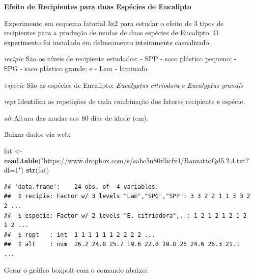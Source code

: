 \documentclass[
]{book}
\newenvironment{Shaded}{\begin{snugshade}}{\end{snugshade}}
\newcommand{\DataTypeTok}[1]{\textcolor[rgb]{0.13,0.29,0.53}{#1}}
\newcommand{\KeywordTok}[1]{\textcolor[rgb]{0.13,0.29,0.53}{\textbf{#1}}}
\newcommand{\NormalTok}[1]{#1}
\newcommand{\OperatorTok}[1]{\textcolor[rgb]{0.81,0.36,0.00}{\textbf{#1}}}
\newcommand{\StringTok}[1]{\textcolor[rgb]{0.31,0.60,0.02}{#1}}
\begin{document}
\textbf{Efeito de Recipientes para duas Espécies de Eucalipto}

Experimento em esquema fatorial 3x2 para estudar o efeito de 3 tipos de recipientes para a produção de mudas de duas espécies de Eucalipto. O experimento foi instalado em delineamento inteiramente casualizado.

\emph{recipie}
São os níveis de recipiente estudados:
- SPP - saco plástico pequeno;
- SPG - saco plástico grande; e
- Lam - laminado.

\emph{especie}
São as espécies de Eucalipto: \emph{Eucalyptus citriodora} e \emph{Eucalyptus grandis}

\emph{rept}
Identifica as repetições de cada combinação dos fatores recipiente e espécie.

\emph{alt}
Altura das mudas aos 80 dias de idade (cm).

Baixar dados via web:

\begin{Shaded}
\begin{Highlighting}[]
\NormalTok{fat <-}\StringTok{ }\KeywordTok{read.table}\NormalTok{(}\StringTok{"https://www.dropbox.com/s/sahc5n80rlkcfx4/BanzattoQd5.2.4.txt?dl=1"}\NormalTok{)}
\KeywordTok{str}\NormalTok{(fat)}
\end{Highlighting}
\end{Shaded}

\begin{verbatim}
## 'data.frame':    24 obs. of  4 variables:
##  $ recipie: Factor w/ 3 levels "Lam","SPG","SPP": 3 3 2 2 1 1 3 3 2 2 ...
##  $ especie: Factor w/ 2 levels "E. citriodora",..: 1 2 1 2 1 2 1 2 1 2 ...
##  $ rept   : int  1 1 1 1 1 1 2 2 2 2 ...
##  $ alt    : num  26.2 24.8 25.7 19.6 22.8 19.8 26 24.6 26.3 21.1 ...
\end{verbatim}

Gerar o gráfico boxpolt com o comando abaixo:

\begin{Shaded}
\end{Shaded}
\end{document}
